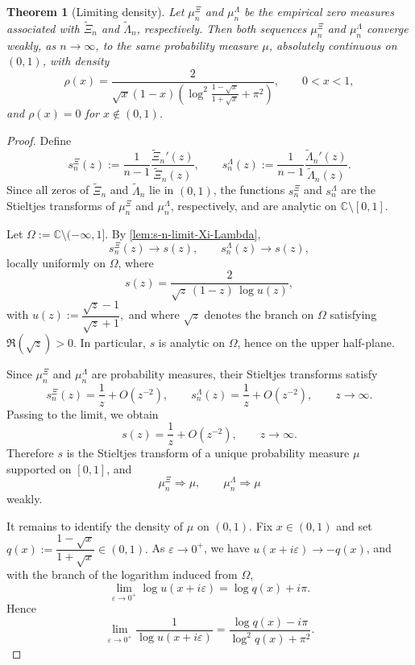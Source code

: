 \documentclass[11pt,twoside]{article}
\newtheorem{theorem}{Theorem}[section]
\numberwithin{equation}{section}
\begin{document}
\begin{theorem}[Limiting density]\label{thm:limiting-density}
Let \(\mu_n^{\Xi}\) and \(\mu_n^{\Lambda}\) be the empirical zero measures associated with
\(\widetilde{\Xi}_n\) and \(\widetilde{\Lambda}_n\), respectively. Then both sequences
\(\mu_n^{\Xi}\) and \(\mu_n^{\Lambda}\) converge weakly, as \(n\to\infty\), to the same
probability measure \(\mu\), absolutely continuous on \((0,1)\), with density
\begin{equation}\label{eq:rho-density}
\rho(x)
=
\frac{2}{\sqrt{x}(1-x)\left(\log^2\!\frac{1-\sqrt{x}}{1+\sqrt{x}}+\pi^2\right)},
\qquad 0<x<1,
\end{equation}
and \(\rho(x)=0\) for \(x\notin(0,1)\).
\end{theorem}

\begin{proof}
Define
\[
s_n^{\Xi}(z):=\frac{1}{n-1}\frac{\widetilde{\Xi}_n'(z)}{\widetilde{\Xi}_n(z)},
\qquad
s_n^{\Lambda}(z):=\frac{1}{n-1}\frac{\widetilde{\Lambda}_n'(z)}{\widetilde{\Lambda}_n(z)}.
\]
Since all zeros of \(\widetilde{\Xi}_n\) and \(\widetilde{\Lambda}_n\) lie in \((0,1)\), the functions
\(s_n^{\Xi}\) and \(s_n^{\Lambda}\) are the Stieltjes transforms of \(\mu_n^{\Xi}\) and
\(\mu_n^{\Lambda}\), respectively, and are analytic on \(\mathbb{C}\setminus[0,1]\).

Let \(\Omega:=\mathbb{C}\setminus(-\infty,1]\). By \cref{lem:s-n-limit-Xi-Lambda},
\[
s_n^{\Xi}(z)\to s(z),
\qquad
s_n^{\Lambda}(z)\to s(z),
\]
locally uniformly on \(\Omega\), where
\begin{equation}\label{eq:s-limit}
s(z)
=
\frac{2}{\sqrt{z}\,(1-z)\,\log u(z)},
\end{equation}
with
\(
u(z):=\dfrac{\sqrt{z}-1}{\sqrt{z}+1},
\)
and where \(\sqrt{z}\) denotes the branch on \(\Omega\) satisfying \(\Re(\sqrt z)>0\).
In particular, \(s\) is analytic on \(\Omega\), hence on the upper half-plane.

Since \(\mu_n^{\Xi}\) and \(\mu_n^{\Lambda}\) are probability measures, their Stieltjes transforms satisfy
\[
s_n^{\Xi}(z)=\frac{1}{z}+O(z^{-2}),
\qquad
s_n^{\Lambda}(z)=\frac{1}{z}+O(z^{-2}),
\qquad z\to\infty.
\]
Passing to the limit, we obtain
\[
s(z)=\frac{1}{z}+O(z^{-2}),
\qquad z\to\infty.
\]
Therefore \(s\) is the Stieltjes transform of a unique probability measure \(\mu\) supported on \([0,1]\), and
\[
\mu_n^{\Xi}\Rightarrow\mu,
\qquad
\mu_n^{\Lambda}\Rightarrow\mu
\]
weakly.

It remains to identify the density of \(\mu\) on \((0,1)\). Fix \(x\in(0,1)\) and set
\(
q(x):=\dfrac{1-\sqrt{x}}{1+\sqrt{x}}\in(0,1).
\)
As \(\varepsilon\to0^+\), we have \(u(x+i\varepsilon)\to -q(x)\), and with the branch of the logarithm induced from \(\Omega\),
\[
\lim_{\varepsilon\to0^+}\log u(x+i\varepsilon)=\log q(x)+i\pi.
\]
Hence
\[
\lim_{\varepsilon\to0^+}\frac{1}{\log u(x+i\varepsilon)}
=
\frac{\log q(x)-i\pi}{\log^2 q(x)+\pi^2}.
\]


\end{proof}
\end{document}
